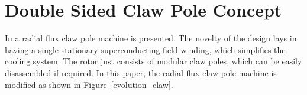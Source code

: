 \documentclass[12pt]{iopart}
\begin{document}
\section{Double Sided Claw Pole Concept}

In \cite{Keysan2011e, Keysan2012a} a radial flux claw pole machine is presented. The novelty of the design lays in having a single stationary superconducting field winding, which simplifies the cooling system. The rotor just consists of modular claw poles, which can be easily disassembled if required. In this paper, the radial flux claw pole machine is modified as shown in Figure~\ref{evolution_claw}.

\begin{figure}[]
  \centering
  \hspace{0.2in}
  

\end{figure}
\end{document}
